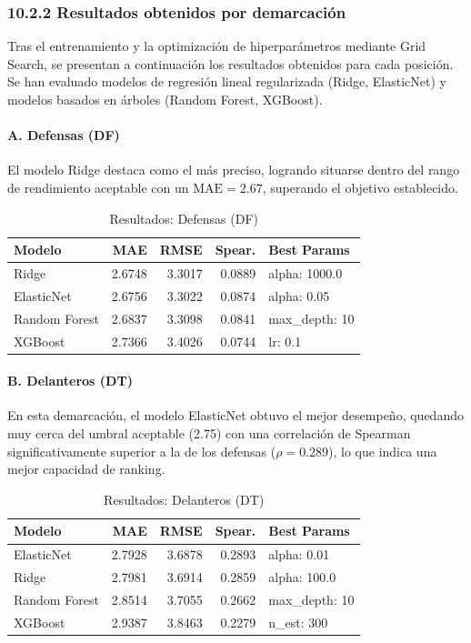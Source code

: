 \subsubsection{10.2.2 Resultados obtenidos por demarcación}

Tras el entrenamiento y la optimización de hiperparámetros mediante 
Grid Search, se presentan a continuación los resultados obtenidos 
para cada posición. Se han evaluado modelos de regresión lineal 
regularizada (Ridge, ElasticNet) y modelos basados en árboles 
(Random Forest, XGBoost).


\paragraph{A. Defensas (DF)}

El modelo Ridge destaca como el más preciso, logrando situarse 
dentro del rango de rendimiento aceptable con un 
$\mathrm{MAE} = 2.67$, superando el objetivo establecido.

\begin{table}[H]
\centering
\small
\begin{tabular}{|l|r|r|r|p{3cm}|}
\hline
\textbf{Modelo} & \textbf{MAE} & \textbf{RMSE} & \textbf{Spear.} & 
\textbf{Best Params} \\
\hline
Ridge & 2.6748 & 3.3017 & 0.0889 & alpha:
1000.0 \\
ElasticNet & 2.6756 & 3.3022 & 0.0874 & alpha: 0.05 \\
Random Forest & 2.6837 & 3.3098 & 0.0841 & max\_depth: 10 \\
XGBoost & 2.7366 & 3.4026 & 0.0744 & lr: 0.1 \\
\hline
\end{tabular}
\caption{Resultados: Defensas (DF)}
\end{table}


\paragraph{B. Delanteros (DT)}

En esta demarcación, el modelo ElasticNet obtuvo el mejor 
desempeño, quedando muy cerca del umbral aceptable (2.75) con una 
correlación de Spearman significativamente superior a la de los 
defensas ($\rho = 0.289$), lo que indica una mejor capacidad de 
ranking.

\begin{table}[H]
\centering
\small
\begin{tabular}{|l|r|r|r|p{3cm}|}
\hline
\textbf{Modelo} & \textbf{MAE} & \textbf{RMSE} & \textbf{Spear.} & 
\textbf{Best Params} \\
\hline
ElasticNet & 2.7928 & 3.6878 & 0.2893 & alpha: 0.01 \\
Ridge & 2.7981 & 3.6914 & 0.2859 & alpha: 100.0 \\
Random Forest & 2.8514 & 3.7055 & 0.2662 & max\_depth: 10 \\
XGBoost & 2.9387 & 3.8463 & 0.2279 & n\_est: 300 \\
\hline
\end{tabular}
\caption{Resultados: Delanteros (DT)}
\end{table}



